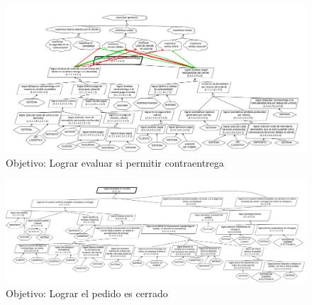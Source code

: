 \begin{figure}[H]\begin{center}
  \includegraphics[angle=90,height=.9\textheight]{tp1/images/objetivos-permitir-contraentrega.pdf}
  \caption{Objetivo: Lograr evaluar si permitir contraentrega}
\end{center}\end{figure}

\begin{figure}[H]\begin{center}
  \includegraphics[angle=90,height=.9\textheight]{tp1/images/objetivos-cerrar-pedido.pdf}
  \caption{Objetivo: Lograr el pedido es cerrado}
\end{center}\end{figure}
